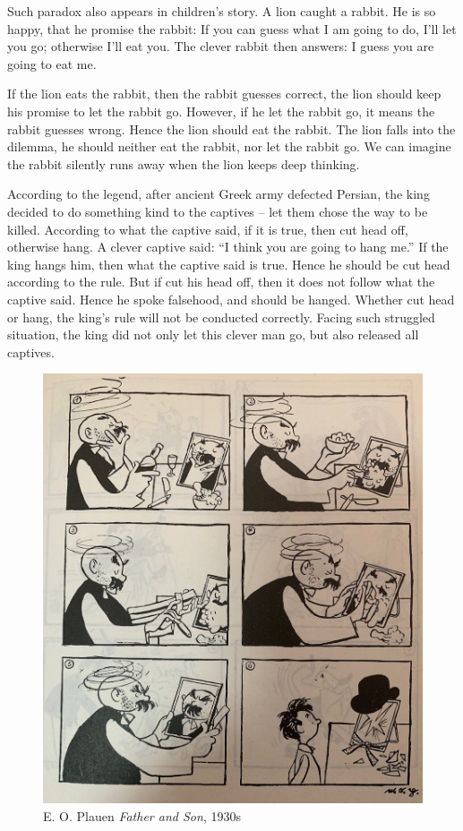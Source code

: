 \documentclass{article}
\begin{document}
Such paradox also appears in children's story. A lion caught a rabbit. He is so happy, that he promise the rabbit: If you can guess what I am going to do, I'll let you go; otherwise I'll eat you. The clever rabbit then answers: I guess you are going to eat me.

If the lion eats the rabbit, then the rabbit guesses correct, the lion should keep his promise to let the rabbit go. However, if he let the rabbit go, it means the rabbit guesses wrong. Hence the lion should eat the rabbit. The lion falls into the dilemma, he should neither eat the rabbit, nor let the rabbit go. We can imagine the rabbit silently runs away when the lion keeps deep thinking.

According to the legend, after ancient Greek army defected Persian, the king decided to do something kind to the captives -- let them chose the way to be killed. According to what the captive said, if it is true, then cut head off, otherwise hang. A clever captive said: ``I think you are going to hang me.'' If the king hangs him, then what the captive said is true. Hence he should be cut head according to the rule. But if cut his head off, then it does not follow what the captive said. Hence he spoke falsehood, and should be hanged. Whether cut head or hang, the king's rule will not be conducted correctly. Facing such struggled situation, the king did not only let this clever man go, but also released all captives.

\begin{figure}
 \centering
 \includegraphics[scale=0.17]{img/father-and-son.jpg}
 \captionsetup{labelformat=empty}
 \caption{E. O. Plauen {\em Father and Son}, 1930s}
 \label{fig:father-and-son}
\end{figure}
\end{document}
